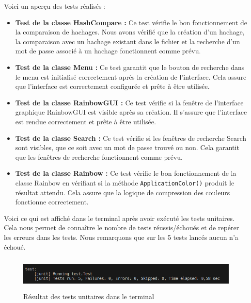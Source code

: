 \documentclass[a4paper,12pt]{article}
\begin{document}
Voici un aperçu des tests réalisés :\\

\begin{itemize}
    \item \textbf{Test de la classe HashCompare :} Ce test vérifie le bon fonctionnement de la comparaison de hachages. Nous avons vérifié que la création d'un hachage, la comparaison avec un hachage existant dans le fichier et la recherche d'un mot de passe associé à un hachage fonctionnent comme prévu.\newline
    
    \item \textbf{Test de la classe Menu :} Ce test garantit que le bouton de recherche dans le menu est initialisé correctement après la création de l'interface. Cela assure que l'interface est correctement configurée et prête à être utilisée.\newline
    
    \item \textbf{Test de la classe RainbowGUI :} Ce test vérifie si la fenêtre de l'interface graphique RainbowGUI est visible après sa création. Il s'assure que l'interface est rendue correctement et prête à être utilisée.\newline
    
    \item \textbf{Test de la classe Search :} Ce test vérifie si les fenêtres de recherche Search sont visibles, que ce soit avec un mot de passe trouvé ou non. Cela garantit que les fenêtres de recherche fonctionnent comme prévu.\newline
    
    \item \textbf{Test de la classe Rainbow :} Ce test vérifie le bon fonctionnement de la classe Rainbow en vérifiant si la méthode \texttt{ApplicationColor()} produit le résultat attendu. Cela assure que la logique de compression des couleurs fonctionne correctement.
\end{itemize}\vspace{12pt}

Voici ce qui est affiché dans le terminal après avoir exécuté les tests unitaires. Cela nous permet de connaître le nombre de tests réussis/échoués et de repérer les erreurs dans les tests. Nous remarquons que sur les 5 tests lancés aucun n'a échoué.

\begin{figure}[H]
\centering
\includegraphics[height=1.7cm]{img/tests_unitaire.png}
\caption{Résultat des tests unitaires dans le terminal}
\end{figure}
\end{document}
